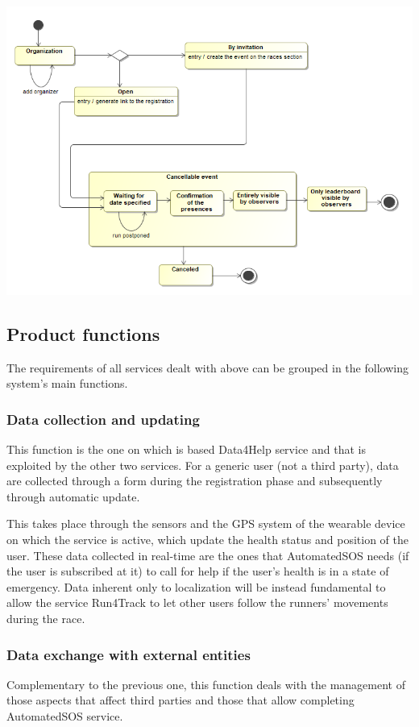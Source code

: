 \begin{center}
\includegraphics[scale=0.6]{sections/diagrams/stateDiagram.png}
\end{center}

\subsection{Product functions}
The requirements of all services dealt with above can be grouped in the following system's main functions.

\subsubsection{Data collection and updating}
This function is the one on which is based Data4Help service and that is exploited by the other two services. For a generic user (not a third party), data are collected through a form during the registration phase and subsequently through automatic update.

This takes place through the sensors and the GPS system of the wearable device on which the service is active, which update the health status and position of the user. These data collected in real-time are the ones that AutomatedSOS needs (if the user is subscribed at it) to call for help if the user's health is in a state of emergency. Data inherent only to localization will be instead fundamental to allow the service Run4Track to let other users follow the runners' movements during the race.

\subsubsection{Data exchange with external entities}
Complementary to the previous one, this function deals with the management of those aspects that affect third parties and those that allow completing AutomatedSOS service.

